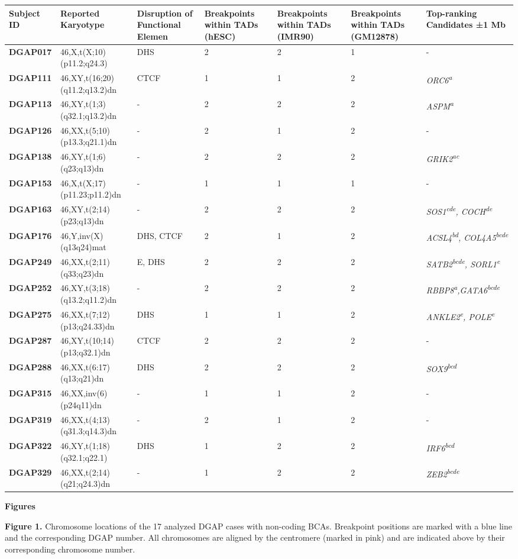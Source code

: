 \documentclass[a4paper,twoside=true,openright,parskip=full,chapterprefix=true,11pt,headings=normal,bibliography=totoc,listof=totoc,titlepage=on,captions=tableabove,draft=false]{scrreprt}
\theoremstyle{definition}
\theoremstyle{definition}
\theoremstyle{definition}
\theoremstyle{remark}
\begin{document}
\begin{longtable}[]{@{}lllllll@{}}
\toprule
\textbf{Subject ID} & \textbf{Reported Karyotype} & \textbf{Disruption
of Functional Elemen} & \textbf{Breakpoints within TADs (hESC)} &
\textbf{Breakpoints within TADs (IMR90)} & \textbf{Breakpoints within
TADs (GM12878)} & \textbf{Top-ranking Candidates ±1 Mb }\tabularnewline
\midrule
\endhead
\textbf{DGAP017} & 46,X,t(X;10)(p11.2;q24.3) & DHS & 2 & 2 & 1 &
-\tabularnewline
\textbf{DGAP111} & 46,XY,t(16;20)(q11.2;q13.2)dn & CTCF & 1 & 1 & 2 &
\emph{ORC6\textsuperscript{a}}\tabularnewline
\textbf{DGAP113} & 46,XY,t(1;3)(q32.1;q13.2)dn & - & 2 & 2 & 2 &
\emph{ASPM\textsuperscript{a}}\tabularnewline
\textbf{DGAP126} & 46,XX,t(5;10)(p13.3;q21.1)dn & - & 2 & 1 & 2 &
-\tabularnewline
\textbf{DGAP138} & 46,XY,t(1;6)(q23;q13)dn & - & 2 & 2 & 2 &
\emph{GRIK2\textsuperscript{ac}}\tabularnewline
\textbf{DGAP153} & 46,X,t(X;17)(p11.23;p11.2)dn & - & 1 & 1 & 1 &
-\tabularnewline
\textbf{DGAP163} & 46,XY,t(2;14)(p23;q13)dn & - & 2 & 2 & 2 &
\emph{SOS1\textsuperscript{cde},
COCH\textsuperscript{de}}\tabularnewline
\textbf{DGAP176} & 46,Y,inv(X)(q13q24)mat & DHS, CTCF & 2 & 1 & 2 &
\emph{ACSL4\textsuperscript{bd},
COL4A5\textsuperscript{bcde}}\tabularnewline
\textbf{DGAP249} & 46,XX,t(2;11)(q33;q23)dn & E, DHS & 2 & 2 & 2 &
\emph{SATB2\textsuperscript{bcde},
SORL1\textsuperscript{e}}\tabularnewline
\textbf{DGAP252} & 46,XY,t(3;18)(q13.2;q11.2)dn & - & 2 & 2 & 2 &
\emph{RBBP8\textsuperscript{a},GATA6\textsuperscript{bcde}}\tabularnewline
\textbf{DGAP275} & 46,XX,t(7;12)(p13;q24.33)dn & DHS & 1 & 1 & 2 &
\emph{ANKLE2\textsuperscript{e}, POLE\textsuperscript{e}}\tabularnewline
\textbf{DGAP287} & 46,XY,t(10;14)(p13;q32.1)dn & CTCF & 2 & 2 & 2 &
-\tabularnewline
\textbf{DGAP288} & 46,XX,t(6:17)(q13;q21)dn & DHS & 2 & 2 & 2 &
\emph{SOX9\textsuperscript{bcd}}\tabularnewline
\textbf{DGAP315} & 46,XX,inv(6)(p24q11)dn & - & 1 & 1 & 2 &
-\tabularnewline
\textbf{DGAP319} & 46,XX,t(4;13)(q31.3;q14.3)dn & - & 2 & 1 & 2 &
-\tabularnewline
\textbf{DGAP322} & 46,XY,t(1;18)(q32.1;q22.1) & DHS & 1 & 2 & 2 &
\emph{IRF6\textsuperscript{bcd}}\tabularnewline
\textbf{DGAP329} & 46,XX,t(2;14)(q21;q24.3)dn & - & 1 & 2 & 2 &
\emph{ZEB2\textsuperscript{bcde}}\tabularnewline
\bottomrule
\end{longtable}

\textbf{Figures}

\textbf{Figure 1.} Chromosome locations of the 17 analyzed DGAP cases
with non-coding BCAs. Breakpoint positions are marked with a blue line
and the corresponding DGAP number. All chromosomes are aligned by the
centromere (marked in pink) and are indicated above by their
corresponding chromosome number.
\end{document}
